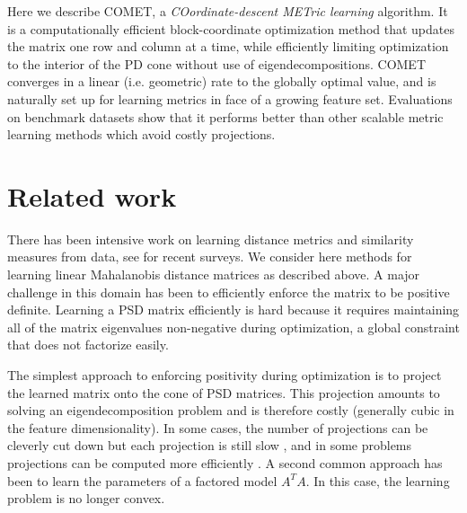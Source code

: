 \documentclass{article} %
\newcommand{\ignore}[1]{}
\begin{document}
\ignore{
Furthermore an important challenge for metric learning is the case where the set of features is not fixed in advance, but changes with time. This is a typical scenario in many real life applications of learning: as more data accumulates, it is possible to estimate more parameters accurately, so more features and signals are gradually added to existing systems. It is therefore desirable to develop algorithms that can learn metrics in face of a growing feature set. 
}

Here we describe COMET, a {\em{COordinate-descent METric learning}} algorithm. It is a computationally efficient block-coordinate optimization method that updates the matrix one row and column at a time, while efficiently limiting optimization to the interior of the PD cone without use of eigendecompositions. COMET converges in a linear (i.e. geometric) rate to the globally optimal value, and is naturally set up for learning metrics in face of a growing feature set. Evaluations on benchmark datasets show that it performs better than other scalable metric learning methods which avoid costly projections. 



\section{Related work}
There has been intensive work on learning distance metrics and similarity measures from data, see \citet{bellet2013survey, kulis2012survey} for recent surveys. We consider here methods for learning linear Mahalanobis distance matrices as described above. A major challenge in this domain has been to efficiently enforce the matrix to be positive definite. Learning a PSD matrix efficiently is hard because it requires maintaining all of the matrix eigenvalues non-negative during optimization, a global constraint that does not factorize easily.

The simplest approach to enforcing positivity during optimization is to project the learned matrix onto the cone of PSD matrices. This projection amounts to solving an eigendecomposition problem and is therefore costly (generally cubic in the feature dimensionality). In some cases, the number of projections can be cleverly cut down but each projection is still slow \cite{qianHD, qian}, and in some problems projections can be computed more efficiently \cite{shalev2004online}. A second common approach has been to learn the parameters of a factored model $A^TA$. In this case, the learning problem is no longer convex. 
\end{document}
